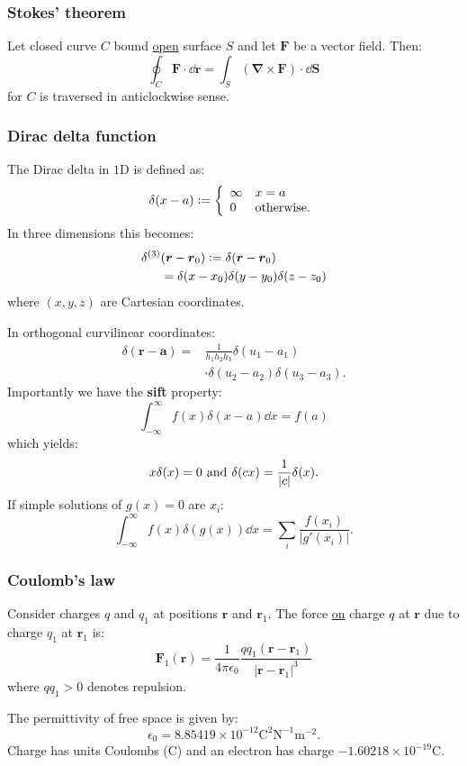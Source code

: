 \documentclass{article}
\newcommand{\deq}{\vcentcolon=}
\newcommand{\vc}[1]{\boldsymbol{#1}}
\begin{document}
\begin{multicols*}{3}
\subsubsection*{Stokes' theorem}
Let closed curve $C$ bound \underline{open} surface $S$
and let $\vc{F}$ be a vector field. Then:
$$\oint_C \vc{F}\cdot\dd\vc{r}
=\int_S (\vc{\nabla}\times\vc{F})\cdot\dd\vc{S}$$
for $C$ is traversed in anticlockwise sense.

\subsubsection*{Dirac delta function}
The Dirac delta in $1$D is defined as:
$$\delta(x-a)\deq\left\{\begin{array}{ll}
    \infty & x=a \\
    0 & \text{otherwise}.
\end{array}\right.$$
In three dimensions this becomes:
\begin{align*}
    \delta^{(3)}&(\vc{r}-\vc{r}_0)
    \deq\delta(\vc{r}-\vc{r}_0) \\
    &=\delta(x-x_0)\delta(y-y_0)\delta(z-z_0)
\end{align*}
where $(x,y,z)$ are Cartesian coordinates.

In orthogonal curvilinear coordinates:
\begin{align*}
    \delta(\vc{r}-\vc{a})
    =&\frac{1}{h_1 h_2 h_3}\delta(u_1-a_1) \\
    &\cdot\delta(u_2-a_2)\delta(u_3-a_3).
\end{align*}
Importantly we have the \textbf{sift} property:
$$\int_{-\infty}^{\infty}f(x)\delta(x-a)\dd x=f(a)$$
which yields:
$$x\delta(x)=0
\hspace{0.05in}\text{and}\hspace{0.05in}
\delta(cx)=\frac{1}{|c|}\delta(x).$$
If simple solutions of $g(x)=0$ are $x_i$:
$$\int_{-\infty}^{\infty}f(x)\delta(g(x))\dd x
=\sum_i\frac{f(x_i)}{|g'(x_i)|}.$$

\subsubsection*{Coulomb's law}
Consider charges $q$ and $q_1$ at positions
$\vc{r}$ and $\vc{r}_1$.
The force \underline{on} charge $q$ at $\vc{r}$
due to charge $q_1$ at $\vc{r}_1$ is:
$$\vc{F}_1(\vc{r})=\frac{1}{4\pi\epsilon_0}
\frac{q q_1(\vc{r}-\vc{r}_1)}{|\vc{r}-\vc{r}_1|^3}$$
where $q q_1>0$ denotes repulsion.

The permittivity of free space is given by:
$$\epsilon_0=8.85419\times10^{-12}
\text{C}^2\text{N}^{-1}\text{m}^{-2}.$$
Charge has units Coulombs (C) and an electron
has charge $-1.60218\times 10^{-19}$C.


\end{multicols*}
\end{document}
